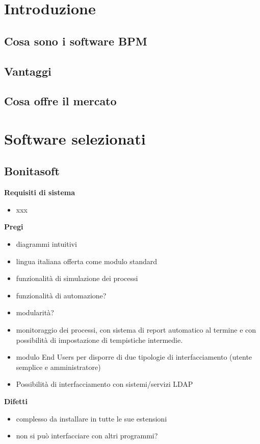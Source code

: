 \section{Introduzione}
	\subsection{Cosa sono i software BPM}
	\subsection{Vantaggi}
	\subsection{Cosa offre il mercato}
	
\section{Software selezionati}
	\subsection{Bonitasoft}
		
\textbf{Requisiti di sistema}	
	\begin{itemize}
		\item xxx	
	\end{itemize}		

	
\textbf{Pregi}
\begin{itemize}
		\item diagrammi intuitivi
		\item lingua italiana offerta come modulo standard
		\item funzionalità di simulazione dei processi
		\item funzionalità di automazione?
		\item modularità?
		\item monitoraggio dei processi, con sistema di report automatico al termine e con possibilità di impostazione di tempistiche intermedie.		
		\item modulo End Users per  disporre di due tipologie di interfacciamento (utente semplice e amministratore)
		\item Possibilità di interfacciamento con sistemi/servizi LDAP 	
		
\end{itemize}	
	
\textbf{Difetti}
	
	\begin{itemize}
		\item complesso da installare in tutte le sue estensioni
		\item non si può interfacciare con altri programmi?
	\end{itemize}		
	

